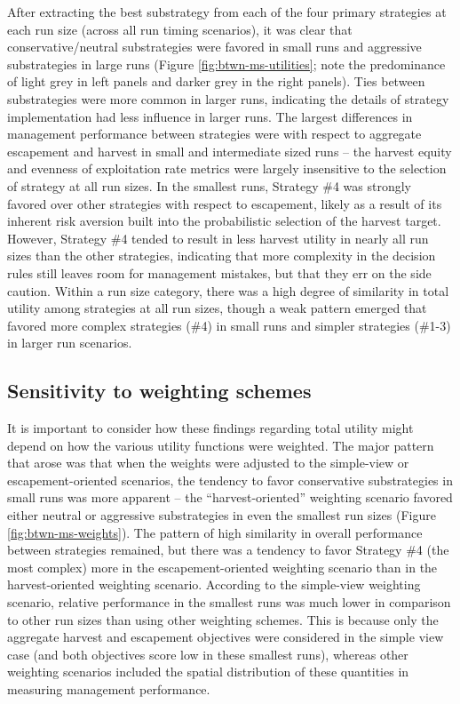 \documentclass[12pt,]{book}
\theoremstyle{definition}
\theoremstyle{definition}
\theoremstyle{definition}
\theoremstyle{remark}
\begin{document}
\noindent
After extracting the best substrategy from each of the four primary
strategies at each run size (across all run timing scenarios), it was
clear that conservative/neutral substrategies were favored in small runs
and aggressive substrategies in large runs (Figure
\ref{fig:btwn-ms-utilities}; note the predominance of light grey in left
panels and darker grey in the right panels). Ties between substrategies
were more common in larger runs, indicating the details of strategy
implementation had less influence in larger runs. The largest
differences in management performance between strategies were with
respect to aggregate escapement and harvest in small and intermediate
sized runs -- the harvest equity and evenness of exploitation rate
metrics were largely insensitive to the selection of strategy at all run
sizes. In the smallest runs, Strategy \#4 was strongly favored over
other strategies with respect to escapement, likely as a result of its
inherent risk aversion built into the probabilistic selection of the
harvest target. However, Strategy \#4 tended to result in less harvest
utility in nearly all run sizes than the other strategies, indicating
that more complexity in the decision rules still leaves room for
management mistakes, but that they err on the side caution. Within a run
size category, there was a high degree of similarity in total utility
among strategies at all run sizes, though a weak pattern emerged that
favored more complex strategies (\#4) in small runs and simpler
strategies (\#1-3) in larger run scenarios.

\subsection{Sensitivity to weighting
schemes}\label{sensitivity-to-weighting-schemes}

\noindent
It is important to consider how these findings regarding total utility
might depend on how the various utility functions were weighted. The
major pattern that arose was that when the weights were adjusted to the
simple-view or escapement-oriented scenarios, the tendency to favor
conservative substrategies in small runs was more apparent -- the
``harvest-oriented'' weighting scenario favored either neutral or
aggressive substrategies in even the smallest run sizes (Figure
\ref{fig:btwn-ms-weights}). The pattern of high similarity in overall
performance between strategies remained, but there was a tendency to
favor Strategy \#4 (the most complex) more in the escapement-oriented
weighting scenario than in the harvest-oriented weighting scenario.
According to the simple-view weighting scenario, relative performance in
the smallest runs was much lower in comparison to other run sizes than
using other weighting schemes. This is because only the aggregate
harvest and escapement objectives were considered in the simple view
case (and both objectives score low in these smallest runs), whereas
other weighting scenarios included the spatial distribution of these
quantities in measuring management performance.
\end{document}
